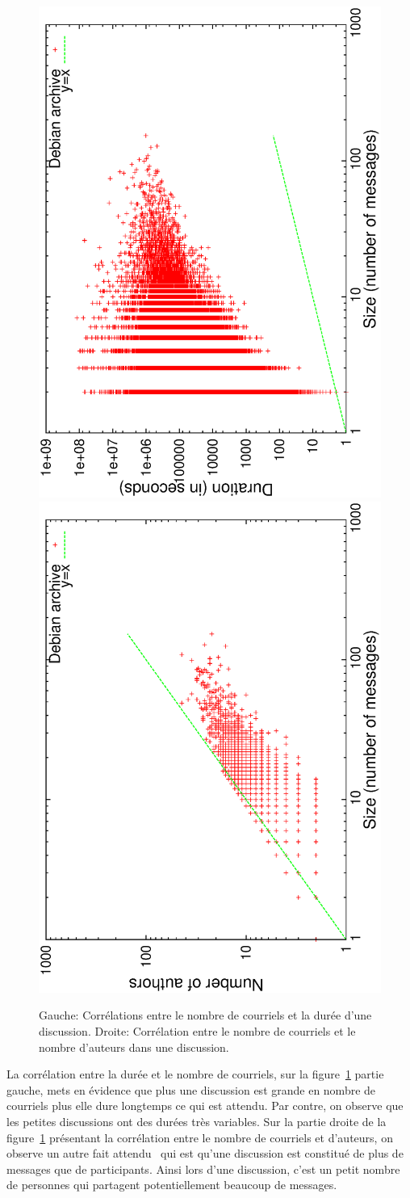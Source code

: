 \begin{figure}
	\includegraphics[angle=-90, width=0.49\linewidth]{img/mailing/sizes-durations-corr.eps}
	\includegraphics[angle=-90, width=0.49\linewidth]{img/mailing/sizes-authors-corr.eps}
	\caption{Gauche: Corrélations entre le nombre de courriels et la durée d'une discussion. Droite: Corrélation entre le nombre de courriels et le nombre d'auteurs dans une discussion.}
	\label{fig:corr_discussion}
\end{figure}

La corrélation entre la durée et le nombre de courriels, sur la figure~\ref{fig:corr_discussion} partie gauche, mets en évidence que plus une discussion est grande en nombre de courriels plus elle dure longtemps ce qui est attendu.
Par contre, on observe que les petites discussions ont des durées très variables. 
Sur la partie droite de la figure~\ref{fig:corr_discussion} présentant la corrélation entre le nombre de courriels et d'auteurs, on observe un autre fait attendu~\cite{Dorat2007} qui est qu'une discussion est constitué de plus de messages que de participants.
Ainsi lors d'une discussion, c'est un petit nombre de personnes qui partagent potentiellement beaucoup de messages. 


